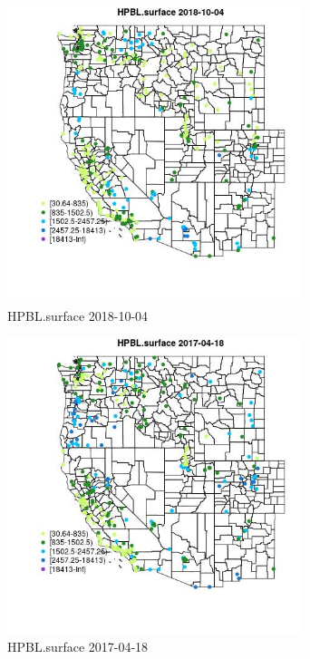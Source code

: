 \begin{figure} 
\centering  
\includegraphics[width=0.77\textwidth]{Code_Outputs/Report_ML_input_PM25_Step4_part_f_de_duplicated_aveswNAs_MapObsHPBLsurface2018-10-04.jpg} 
\caption{\label{fig:Report_ML_input_PM25_Step4_part_f_de_duplicated_aveswNAsMapObsHPBLsurface2018-10-04}HPBL.surface 2018-10-04} 
\end{figure} 
 

\begin{figure} 
\centering  
\includegraphics[width=0.77\textwidth]{Code_Outputs/Report_ML_input_PM25_Step4_part_f_de_duplicated_aveswNAs_MapObsHPBLsurface2017-04-18.jpg} 
\caption{\label{fig:Report_ML_input_PM25_Step4_part_f_de_duplicated_aveswNAsMapObsHPBLsurface2017-04-18}HPBL.surface 2017-04-18} 
\end{figure} 
 

